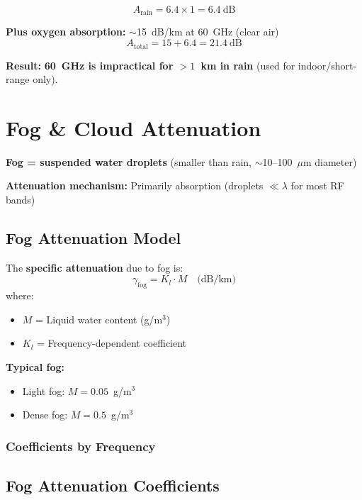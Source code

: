 \begin{equation}
A_{\text{rain}} = 6.4 \times 1 = 6.4~\text{dB}
\end{equation}

\textbf{Plus oxygen absorption:} $\sim$15~dB/km at 60~GHz (clear air)
\begin{equation}
A_{\text{total}} = 15 + 6.4 = 21.4~\text{dB}
\end{equation}

\textbf{Result:} \textbf{60~GHz is impractical for $>1$~km in rain} (used for indoor/short-range only).

\section{Fog \& Cloud Attenuation}

\textbf{Fog = suspended water droplets} (smaller than rain, $\sim$10--100~$\mu$m diameter)

\textbf{Attenuation mechanism:} Primarily absorption (droplets $\ll \lambda$ for most RF bands)

\subsection{Fog Attenuation Model}

The \textbf{specific attenuation} due to fog is:
\begin{equation}
\gamma_{\text{fog}} = K_l \cdot M \quad \text{(dB/km)}
\end{equation}
where:
\begin{itemize}
\item $M$ = Liquid water content (g/m$^3$)
\item $K_l$ = Frequency-dependent coefficient
\end{itemize}

\textbf{Typical fog:}
\begin{itemize}
\item Light fog: $M = 0.05$~g/m$^3$
\item Dense fog: $M = 0.5$~g/m$^3$
\end{itemize}

\subsubsection{Coefficients by Frequency}

\subsection{Fog Attenuation Coefficients}

